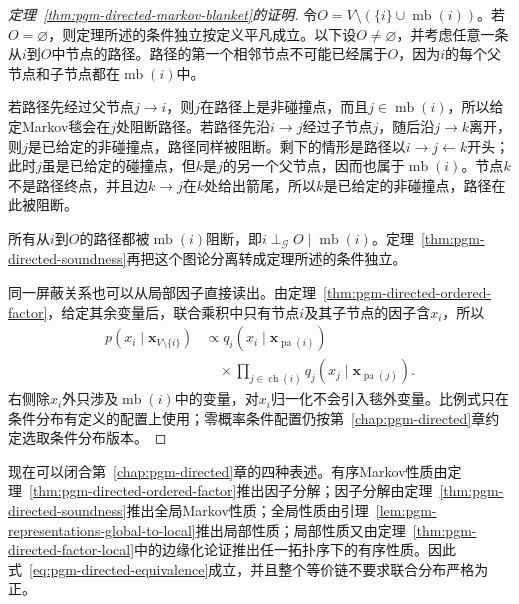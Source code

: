 \begin{proof}[定理~\ref{thm:pgm-directed-markov-blanket}的证明]
令$O=V\setminus(\{i\}\cup\operatorname{mb}(i))$。若$O=\varnothing$，则定理所述的条件独立按定义平凡成立。以下设$O\neq\varnothing$，并考虑任意一条从$i$到$O$中节点的路径。路径的第一个相邻节点不可能已经属于$O$，因为$i$的每个父节点和子节点都在$\operatorname{mb}(i)$中。

若路径先经过父节点$j\to i$，则$j$在路径上是非碰撞点，而且$j\in\operatorname{mb}(i)$，所以给定Markov毯会在$j$处阻断路径。若路径先沿$i\to j$经过子节点$j$，随后沿$j\to k$离开，则$j$是已给定的非碰撞点，路径同样被阻断。剩下的情形是路径以$i\to j\leftarrow k$开头；此时$j$虽是已给定的碰撞点，但$k$是$j$的另一个父节点，因而也属于$\operatorname{mb}(i)$。节点$k$不是路径终点，并且边$k\to j$在$k$处给出箭尾，所以$k$是已给定的非碰撞点，路径在此被阻断。

所有从$i$到$O$的路径都被$\operatorname{mb}(i)$阻断，即$i\perp_{\mathcal G}O\mid\operatorname{mb}(i)$。定理~\ref{thm:pgm-directed-soundness}再把这个图论分离转成定理所述的条件独立。

同一屏蔽关系也可以从局部因子直接读出。由定理~\ref{thm:pgm-directed-ordered-factor}，给定其余变量后，联合乘积中只有节点$i$及其子节点的因子含$x_i$，所以
\begin{equation}
  \begin{aligned}
    p(x_i\mid\bm{x}_{V\setminus\{i\}})
      &\propto q_i(x_i\mid\bm{x}_{\operatorname{pa}(i)})\\
      &\quad{}\times
      \prod_{j\in\operatorname{ch}(i)}
        q_j(x_j\mid\bm{x}_{\operatorname{pa}(j)}).
  \end{aligned}
  \label{eq:pgm-directed-blanket-conditional}
\end{equation}
右侧除$x_i$外只涉及$\operatorname{mb}(i)$中的变量，对$x_i$归一化不会引入毯外变量。比例式只在条件分布有定义的配置上使用；零概率条件配置仍按第~\ref{chap:pgm-directed}章约定选取条件分布版本。
\end{proof}

现在可以闭合第~\ref{chap:pgm-directed}章的四种表述。有序Markov性质由定理~\ref{thm:pgm-directed-ordered-factor}推出因子分解；因子分解由定理~\ref{thm:pgm-directed-soundness}推出全局Markov性质；全局性质由引理~\ref{lem:pgm-representations-global-to-local}推出局部性质；局部性质又由定理~\ref{thm:pgm-directed-factor-local}中的边缘化论证推出任一拓扑序下的有序性质。因此式~\eqref{eq:pgm-directed-equivalence}成立，并且整个等价链不要求联合分布严格为正。

